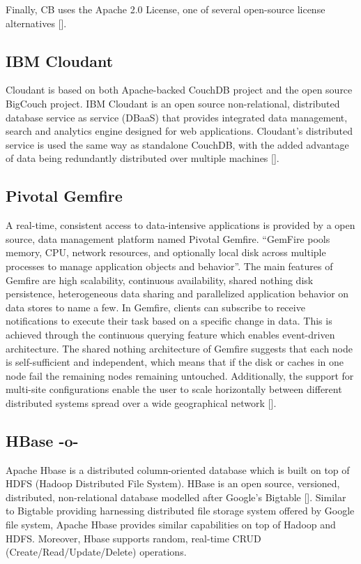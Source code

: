 Finally, CB uses the Apache 2.0 License, one of several open-source
license alternatives [\cite{www-quora-cbs}].




\subsection{IBM Cloudant}
     
Cloudant is based on both Apache-backed CouchDB project and the open
source BigCouch project. IBM Cloudant is an open source
non-relational, distributed database service as service (DBaaS) that
provides integrated data management, search and analytics engine
designed for web applications. Cloudant's distributed service is used
the same way as standalone CouchDB, with the added advantage of data
being redundantly distributed over multiple
machines [\cite{www-ibm-cloudant}].
   

\subsection{Pivotal Gemfire}
     
A real-time, consistent access to data-intensive applications is
provided by a open source, data management platform named Pivotal
Gemfire. ``GemFire pools memory, CPU, network resources, and
optionally local disk across multiple processes to manage application
objects and behavior''. The main features of Gemfire are high
scalability, continuous availability, shared nothing disk persistence,
heterogeneous data sharing and parallelized application behavior on
data stores to name a few.  In Gemfire, clients can subscribe to
receive notifications to execute their task based on a specific change
in data. This is achieved through the continuous querying feature
which enables event-driven architecture. The shared nothing
architecture of Gemfire suggests that each node is self-sufficient and
independent, which means that if the disk or caches in one node fail
the remaining nodes remaining untouched. Additionally, the support for
multi-site configurations enable the user to scale horizontally
between different distributed systems spread over a wide geographical
network [\cite{www-gemfire}].
     
\subsection{HBase -o-}

Apache Hbase is a distributed column-oriented database which is built
on top of HDFS (Hadoop Distributed File System). HBase is an open
source, versioned, distributed, non-relational database modelled after
Google's Bigtable [\cite{www-hbase}]. Similar to Bigtable providing
harnessing distributed file storage system offered by Google file
system, Apache Hbase provides similar capabilities on top of Hadoop
and HDFS. Moreover, Hbase supports random, real-time CRUD
(Create/Read/Update/Delete) operations.


